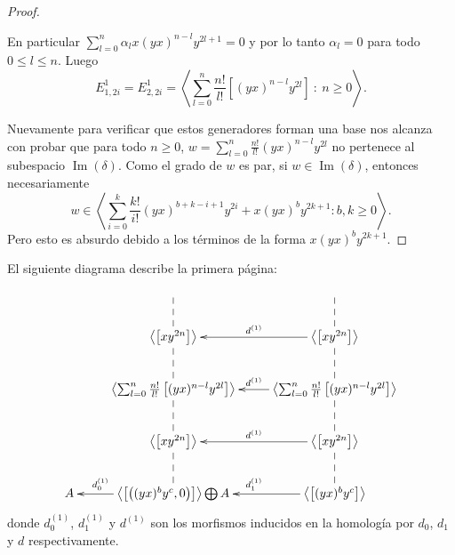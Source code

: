 \documentclass[a4paper,oneside,fleqn,11pt]{article}
\numberwithin{prop}{subsection}
\DeclareMathOperator\Ima{Im}
\begin{document}
\begin{proof}
\begin{itemize}
		En particular $\sum_{l = 0}^n\alpha_lx(yx)^{n - l}y^{2l + 1} = 0$ y por lo tanto $\alpha_l = 0$ para todo $0 \leq l \leq n$.
		Luego
		\[
			E_{1,2i}^1 = E_{2, 2i}^1 = \left\langle \sum_{l = 0}^n \frac{n!}{l!}\left[(yx)^{n - l}y^{2l}\right] \ :\ n \geq 0\right\rangle.
		\]
	\end{itemize}
	Nuevamente para verificar que estos generadores forman una base nos alcanza con probar que para  todo $n \geq 0$,
	$w = \sum_{l = 0}^n \frac{n!}{l!}(yx)^{n - l}y^{2l}$ no pertenece al subespacio $\Ima(\delta)$.
	Como el grado de $w$ es par, si $w \in \Ima(\delta)$, entonces necesariamente
	\[
		w \in \left\langle \sum_{i = 0}^k\frac{k!}{i!}(yx)^{b + k - i + 1}y^{2i} + x(yx)^by^{2k + 1} : b,k \geq 0 \right\rangle.
	\]
	Pero esto es absurdo debido a los términos de la forma $x(yx)^by^{2k + 1}$.
\end{proof}

El siguiente diagrama describe la primera página:
\begin{align*}
\xymatrix{
	& & \\
	& \left\langle \left[xy^{2n}\right] \right\rangle \ar@{--}[u] & \left\langle \left[xy^{2n}\right] \right\rangle \ar[l]_{d^{(1)}} \ar@{--}[u]\\
	& \left\langle \sum_{l = 0}^n \frac{n!}{l!}\left[(yx)^{n - l}y^{2l}\right] \right\rangle \ar@{--}[u]
		& \left\langle \sum_{l = 0}^n \frac{n!}{l!}\left[(yx)^{n - l}y^{2l}\right] \right\rangle \ar[l]_{d^{(1)}} \ar@{--}[u]\\
	& \left\langle \left[xy^{2n}\right] \right\rangle \ar@{--}[u] & \left\langle \left[xy^{2n}\right] \right\rangle \ar[l]_{d^{(1)}} \ar@{--}[u]\\
	A & \left\langle \left[\left((yx)^by^c, 0\right)\right] \right\rangle \bigoplus A \ar[l]_(.7){d_0^{(1)}} \ar@{--}[u]
		& \left\langle \left[(yx)^by^c\right] \right\rangle \ar[l]_{d_1^{(1)}} \ar@{--}[u] \\
}
\end{align*}
donde $d_0^{(1)}$, $d_1^{(1)}$ y $d^{(1)}$ son los morfismos inducidos en la homología por $d_0$, $d_1$ y $d$ respectivamente.
\end{document}
